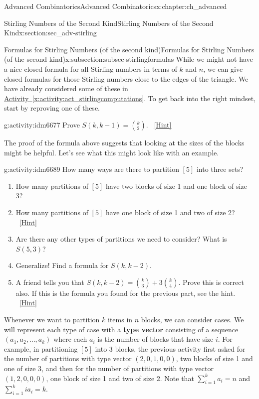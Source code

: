 \documentclass[oneside,10pt,]{book}
\newcommand{\terminology}[1]{\textbf{#1}}
\numberwithin{equation}{chapter}
\begin{document}
\begin{chapterptx}{Advanced Combinatorics}{}{Advanced Combinatorics}{}{}{x:chapter:ch_advanced}
\begin{sectionptx}{Stirling Numbers of the Second Kind}{}{Stirling Numbers of the Second Kind}{}{}{x:section:sec_adv-stirling}
\typeout{************************************************}
%
\begin{subsectionptx}{Formulas for Stirling Numbers (of the second kind)}{}{Formulas for Stirling Numbers (of the second kind)}{}{}{x:subsection:subsec-stirlingformulas}
While we might not have a nice closed formula for all Stirling numbers in terms of \(k\) and \(n\), we can give closed formulas for those Stirling numbers close to the edges of the triangle.  We have already considered some of these in \hyperref[x:activity:act_stirlingcomputations]{Activity~\ref{x:activity:act_stirlingcomputations}}.  To get back into the right mindset, start by reproving one of these.%
\begin{activity}{}{g:activity:idm6677}%
Prove \(S(k, k-1) = \binom{k}{2}\).%
\qquad~\hfill{\tiny\hyperlink{g:hint:idm6681-back}{[Hint]}}\end{activity}
The proof of the formula above suggests that looking at the sizes of the blocks might be helpful.  Let's see what this might look like with an example.%
\begin{activity}{}{g:activity:idm6689}%
How many ways are there to partition \([5]\) into three sets?%
\begin{enumerate}[font=\bfseries,label=(\alph*),ref=\alph*]
\item{}How many partitions of \([5]\) have two blocks of size 1 and one block of size 3?%
\item{}How many partitions of \([5]\) have one block of size 1 and two of size 2?%
\qquad~\hfill{\tiny\hyperlink{g:hint:idm6704-back}{[Hint]}}\item{}Are there any other types of partitions we need to consider?  What is \(S(5,3)\)?%
\item{}Generalize! Find a formula for \(S(k, k-2)\).%
\item{}A friend tells you that \(S(k,k-2) = \binom{k}{3} + 3 \binom{k}{4}\).  Prove this is correct also.  If this is the formula you found for the previous part, see the hint.%
\qquad~\hfill{\tiny\hyperlink{g:hint:idm6735-back}{[Hint]}}\end{enumerate}
\end{activity}
 Whenever we want to partition \(k\) items in \(n\) blocks, we can consider cases.  We will represent each type of case with a \terminology{type vector} consisting of a sequence \((a_1, a_2, \ldots, a_k)\) where each \(a_i\) is the number of blocks that have size \(i\).  For example, in partitioning \([5]\) into 3 blocks, the previous activity first asked for the number of partitions with type vector \((2,0,1,0,0)\), two blocks of size 1 and one of size 3, and then for the number of partitions with type vector \((1,2,0,0,0)\), one block of size 1 and two of size 2.  Note that \(\sum_{i=1}^k a_i = n\) and \(\sum_{i=1}^k ia_i = k\).%

\end{subsectionptx}
\end{sectionptx}
\end{chapterptx}
\end{document}
